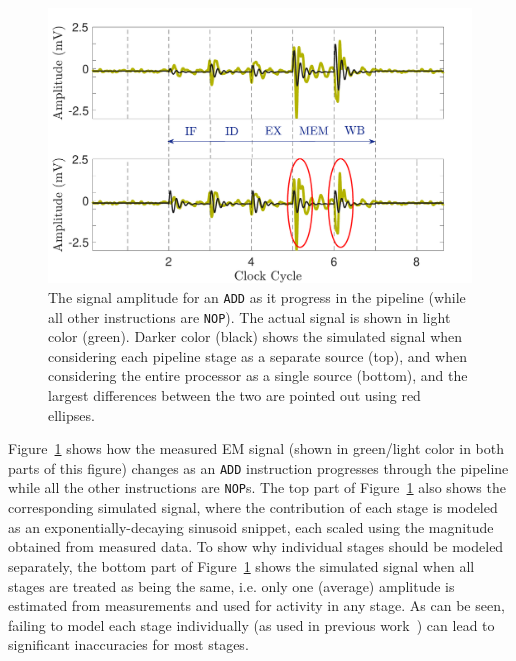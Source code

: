 \begin{figure}
	\centering
	\includegraphics[width=0.4\columnwidth,clip]{figure/amp2.pdf}
	\caption{The signal amplitude for an {\tt ADD} as it progress in the pipeline (while all other instructions are {\tt NOP}). The actual signal is shown in light color (green). Darker color (black) shows the simulated signal when considering each pipeline stage as a separate source (top), and when considering the entire processor as a single source (bottom), and the largest differences between the two are pointed out using red ellipses.}
	\label{fig:amp}
	\vspace{-5mm}
\end{figure}
Figure~\ref{fig:amp} shows how the measured EM signal (shown in green/light color in both parts of this figure) changes as an {\tt ADD} instruction progresses through the pipeline while all the other instructions are {\tt NOP}s.
The top part of Figure~\ref{fig:amp} also shows the corresponding simulated signal, where the contribution of each stage is modeled as an exponentially-decaying sinusoid snippet, each scaled using the magnitude obtained from measured data. To show why individual stages should be modeled separately, the bottom part of Figure~\ref{fig:amp} shows the simulated signal when all stages are treated as being the same, i.e. only one (average) amplitude is estimated from measurements and used for activity in any stage. As can be seen, failing to model each stage individually (as used in previous work~\cite{McCann:2017:TPT:3241189.3241207}) can lead to significant inaccuracies for most stages.

